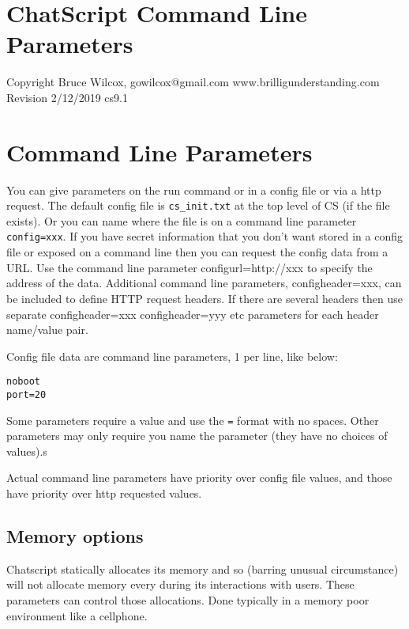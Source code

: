 \documentclass[]{article}
\date{}
\begin{document}
\section{ChatScript Command Line
Parameters}\label{chatscript-command-line-parameters}

Copyright Bruce Wilcox, gowilcox@gmail.com www.brilligunderstanding.com
Revision 2/12/2019 cs9.1

\section{Command Line Parameters}\label{command-line-parameters}

You can give parameters on the run command or in a config file or via a
http request. The default config file is \texttt{cs\_init.txt} at the
top level of CS (if the file exists). Or you can name where the file is
on a command line parameter \texttt{config=xxx}. If you have secret
information that you don't want stored in a config file or exposed on a
command line then you can request the config data from a URL. Use the
command line parameter configurl=http://xxx to specify the address of
the data. Additional command line parameters, configheader=xxx, can be
included to define HTTP request headers. If there are several headers
then use separate configheader=xxx configheader=yyy etc parameters for
each header name/value pair.

Config file data are command line parameters, 1 per line, like below:

\begin{verbatim}
noboot 
port=20
\end{verbatim}

Some parameters require a value and use the \texttt{=} format with no
spaces. Other parameters may only require you name the parameter (they
have no choices of values).s

Actual command line parameters have priority over config file values,
and those have priority over http requested values.

\subsection{Memory options}\label{memory-options}

Chatscript statically allocates its memory and so (barring unusual
circumstance) will not allocate memory every during its interactions
with users. These parameters can control those allocations. Done
typically in a memory poor environment like a cellphone.
\end{document}
